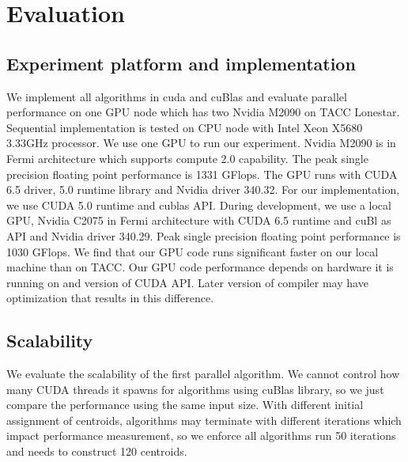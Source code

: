 \section{Evaluation}
\subsection{Experiment platform and implementation}
We implement all algorithms in cuda and cuBlas and evaluate parallel performance on one GPU node which
has two Nvidia M2090 on TACC Lonestar. Sequential implementation is tested on CPU node with
Intel Xeon X5680 3.33GHz processor. We use one GPU to run our experiment. Nvidia M2090 is in Fermi
architecture which supports compute 2.0 capability. The peak single precision floating point performance
is 1331 GFlops. The GPU runs with CUDA 6.5 driver, 5.0
runtime library and Nvidia driver 340.32. For our implementation, we use CUDA 5.0 runtime and cublas API.
During development, we use a local GPU, Nvidia C2075 in Fermi architecture with CUDA 6.5 runtime and cuBl
as API and Nvidia driver 340.29. Peak single precision floating point performance is 1030 GFlops.
We find that our GPU code runs significant faster on our local machine than on TACC. Our GPU code
performance depends on hardware it is running on and version of CUDA API. Later version of compiler may
have optimization that results in this difference. 

\subsection{Scalability}
We evaluate the scalability of the first parallel algorithm. We cannot control how many CUDA threads it
spawns for algorithms using cuBlas library, so we just compare the performance using the same input size.
With different initial assignment of centroids, algorithms may terminate with different iterations which
impact performance measurement, so we enforce all algorithms run 50 iterations and needs to construct
120 centroids. 


